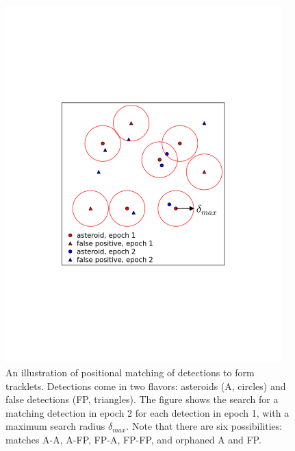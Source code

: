 \begin{figure}[t!]
\centering
\vskip -2.0in
\includegraphics[width=0.95\textwidth]{figures/TrackSlide2}
\vskip -2.2in
\caption{An illustration of positional matching of detections to form tracklets.
Detections come in two flavors: asteroids (A, circles) and false detections (FP, triangles).
The figure shows the search for a matching detection in epoch 2 for each detection
in epoch 1, with a maximum search radius $\delta_{max}$. Note that there are six
possibilities: matches A-A, A-FP, FP-A, FP-FP, and orphaned A and FP.
\label{fig:TrackSlide2}}
\end{figure}

